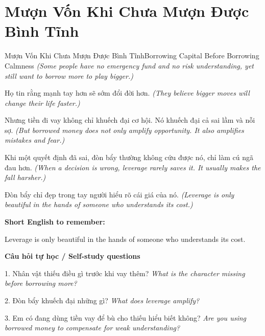 \section{Mượn Vốn Khi Chưa Mượn Được Bình Tĩnh}
\begin{truyen}{Mượn Vốn Khi Chưa Mượn Được Bình Tĩnh}{Borrowing Capital Before Borrowing Calmness}
\textit{(Some people have no emergency fund and no risk understanding, yet still want to borrow more to play bigger.)}

Họ tin rằng mạnh tay hơn sẽ sớm đổi đời hơn.
\textit{(They believe bigger moves will change their life faster.)}

Nhưng tiền đi vay không chỉ khuếch đại cơ hội. Nó khuếch đại cả sai lầm và nỗi sợ.
\textit{(But borrowed money does not only amplify opportunity. It also amplifies mistakes and fear.)}

Khi một quyết định đã sai, đòn bẩy thường không cứu được nó, chỉ làm cú ngã đau hơn.
\textit{(When a decision is wrong, leverage rarely saves it. It usually makes the fall harsher.)}

\end{truyen}

\begin{baihoc}
Đòn bẩy chỉ đẹp trong tay người hiểu rõ cái giá của nó.
\textit{(Leverage is only beautiful in the hands of someone who understands its cost.)}
\end{baihoc}

\begin{ghinhoanh}
\textbf{Short English to remember:}

Leverage is only beautiful in the hands of someone who understands its cost.

\end{ghinhoanh}

\begin{tuhocnhanh}
\textbf{Câu hỏi tự học / Self-study questions}

1. Nhân vật thiếu điều gì trước khi vay thêm? \textit{What is the character missing before borrowing more?}

2. Đòn bẩy khuếch đại những gì? \textit{What does leverage amplify?}

3. Em có đang dùng tiền vay để bù cho thiếu hiểu biết không? \textit{Are you using borrowed money to compensate for weak understanding?}
\end{tuhocnhanh}
\ngancach

